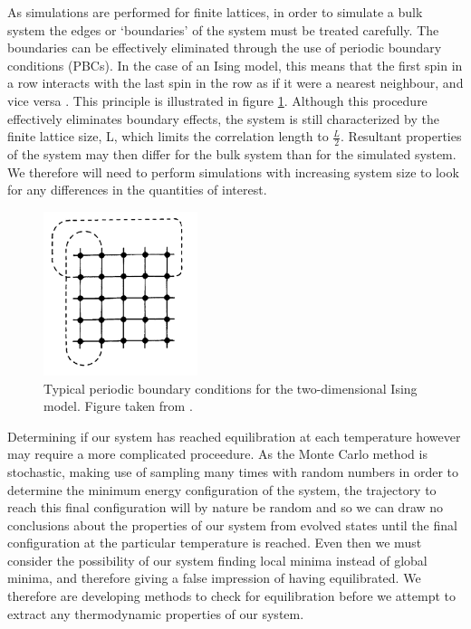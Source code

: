 As simulations are performed for finite lattices, in order to simulate a bulk system the edges or `boundaries' of the system must be treated carefully. The boundaries can be effectively eliminated through the use of periodic boundary conditions (PBCs). In the case of an Ising model, this means that the first spin in a row interacts with the last spin in the row as if it were a nearest neighbour, and vice versa \cite{MC_Landau}. This principle is illustrated in figure \ref{MC_PBCs}. Although this procedure effectively eliminates boundary effects, the system is still characterized by the finite lattice size, L, which limits the correlation length to $\frac{L}{2}$. Resultant properties of the system may then differ for the bulk system than for the simulated system. We therefore will need to perform simulations with increasing system size to look for any differences in the quantities of interest.

\begin{figure}[h!]
  \centering
    \includegraphics[width=0.4\textwidth]{figures/MC_PBCs.png}
    \caption{Typical periodic boundary conditions for the two-dimensional Ising model. Figure taken from .}
  \label{MC_PBCs}
\end{figure}

Determining if our system has reached equilibration at each temperature however may require a more complicated proceedure. As the Monte Carlo method is stochastic, making use of sampling many times with random numbers in order to determine the minimum energy configuration of the system, the trajectory to reach this final configuration will by nature be random and so we can draw no conclusions about the properties of our system from evolved states until the final configuration at the particular temperature is reached. Even then we must consider the possibility of our system finding local minima instead of global minima, and therefore giving a false impression of having equilibrated. We therefore are developing methods to check for equilibration before we attempt to extract any thermodynamic properties of our system.

